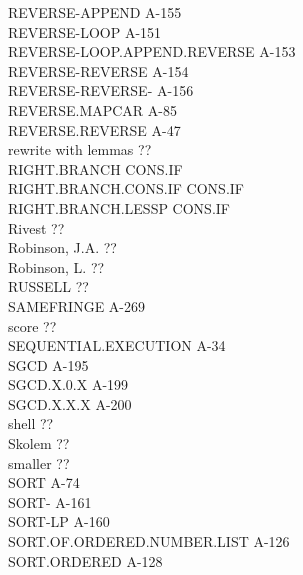 \documentclass[10pt]{book}
\newenvironment{pubasis}{\begin{flushleft}}{\end{flushleft}}
\begin{document}
\begin{pubasis}
REVERSE-APPEND                               A-155\\
REVERSE-LOOP                                 A-151\\
REVERSE-LOOP.APPEND.REVERSE                  A-153\\
REVERSE-REVERSE                              A-154\\
REVERSE-REVERSE-                             A-156\\
REVERSE.MAPCAR                               A-85\\
REVERSE.REVERSE                              A-47\\
rewrite with lemmas                          ??\\
RIGHT.BRANCH                                 CONS.IF\\
RIGHT.BRANCH.CONS.IF                         CONS.IF\\
RIGHT.BRANCH.LESSP                           CONS.IF\\
Rivest                                       ??\\
Robinson, J.A.                               ??\\
Robinson, L.                                 ??\\
RUSSELL                                      ??\\
SAMEFRINGE                                   A-269\\
score                                        ??\\
SEQUENTIAL.EXECUTION                         A-34\\
SGCD                                         A-195\\
SGCD.X.0.X                                   A-199\\
SGCD.X.X.X                                   A-200\\
shell                                        ??\\
Skolem                                       ??\\
smaller                                      ??\\
SORT                                         A-74\\
SORT-                                        A-161\\
SORT-LP                                      A-160\\
SORT.OF.ORDERED.NUMBER.LIST                  A-126\\
SORT.ORDERED                                 A-128\\

\end{pubasis}
\end{document}
